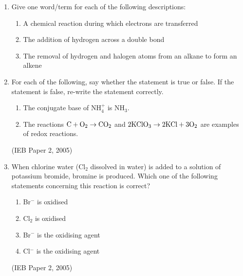 \begin{eocexercises}{}
\begin{enumerate}
\item{
Give one word/term for each of the following descriptions:
\begin{enumerate}
\item{A chemical reaction during which electrons are transferred}
\item{The addition of hydrogen across a double bond}
\item{The removal of hydrogen and halogen atoms from an alkane to form an alkene}
\end{enumerate}
}

\item{
For each of the following, say whether the statement is true or false. If the statement is false, re-write the statement correctly.
\begin{enumerate}
\item{The conjugate base of NH$_{4}^{+}$ is NH$_{3}$.}
\item{The reactions $\rm{C + O_{2} \rightarrow CO_{2}}$ and $\rm{2KClO_{3} \rightarrow 2KCl + 3O_{2}}$ are examples of redox reactions.}
\end{enumerate}
}

% 

(IEB Paper 2, 2005)

\item{
When chlorine water (Cl$_{2}$ dissolved in water) is added to a solution of potassium bromide, bromine is produced. Which one of the following statements concerning this reaction is correct?
\begin{enumerate}
\item{Br$^{-}$ is oxidised}
\item{Cl$_{2}$ is oxidised}
\item{Br$^{-}$ is the oxidising agent}
\item{Cl$^{-}$ is the oxidising agent}
\end{enumerate}
}
(IEB Paper 2, 2005)


\end{enumerate}
\end{eocexercises}
